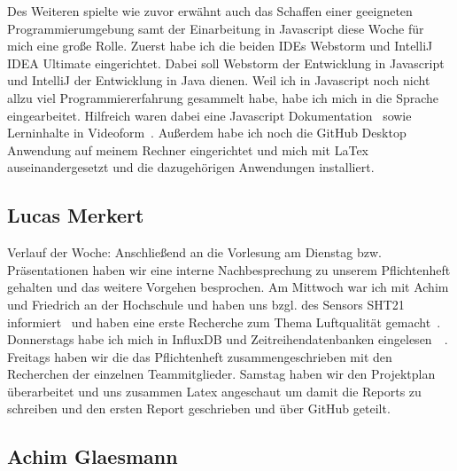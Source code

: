 \documentclass[]{article}
\begin{document}
Des Weiteren spielte wie zuvor erwähnt auch das Schaffen einer geeigneten Programmierumgebung samt der Einarbeitung in Javascript diese Woche für mich eine große Rolle. Zuerst habe ich die beiden IDEs Webstorm und IntelliJ IDEA Ultimate eingerichtet. Dabei soll Webstorm der Entwicklung in Javascript und IntelliJ der Entwicklung in Java dienen. Weil ich in Javascript noch nicht allzu viel Programmiererfahrung gesammelt habe, habe ich mich in die Sprache eingearbeitet. Hilfreich waren dabei eine Javascript Dokumentation~\cite{JS_docu} sowie Lerninhalte in Videoform~\cite{javascript_tut}. Außerdem habe ich noch die GitHub Desktop Anwendung auf meinem Rechner eingerichtet und mich mit LaTex auseinandergesetzt und die dazugehörigen Anwendungen installiert.

\subsection{Lucas Merkert}
Verlauf der Woche: Anschließend an die Vorlesung am Dienstag bzw. Präsentationen haben wir eine interne Nachbesprechung zu unserem Pflichtenheft gehalten und das weitere Vorgehen besprochen. Am Mittwoch war ich mit Achim und Friedrich an der Hochschule und haben uns bzgl. des Sensors SHT21 informiert~\cite{datasheetsht21} und haben eine erste Recherche zum Thema Luftqualität gemacht~\cite{co2letter}. Donnerstags habe ich mich in InfluxDB und Zeitreihendatenbanken eingelesen~\cite{influxdb_sql_db}~\cite{youtube_timeseriesdatabase}. Freitags haben wir die das Pflichtenheft zusammengeschrieben mit den Recherchen der einzelnen Teammitglieder. Samstag haben wir den Projektplan überarbeitet und uns zusammen Latex angeschaut um damit die Reports zu schreiben und den ersten Report geschrieben und über GitHub geteilt.

\subsection{Achim Glaesmann}
\end{document}
